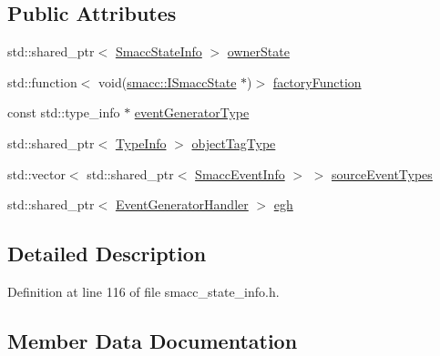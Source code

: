 \subsection*{Public Attributes}
\begin{DoxyCompactItemize}
\item 
std\+::shared\+\_\+ptr$<$ \hyperlink{classsmacc_1_1introspection_1_1SmaccStateInfo}{Smacc\+State\+Info} $>$ \hyperlink{structsmacc_1_1introspection_1_1SmaccEventGeneratorInfo_a94090c0b701e0acd191a62dca72bdf75}{owner\+State}
\item 
std\+::function$<$ void(\hyperlink{classsmacc_1_1ISmaccState}{smacc\+::\+I\+Smacc\+State} $\ast$)$>$ \hyperlink{structsmacc_1_1introspection_1_1SmaccEventGeneratorInfo_a19442e678750a68217b73065111fbe60}{factory\+Function}
\item 
const std\+::type\+\_\+info $\ast$ \hyperlink{structsmacc_1_1introspection_1_1SmaccEventGeneratorInfo_a28c9e5858033ff3fad51b3f046161e93}{event\+Generator\+Type}
\item 
std\+::shared\+\_\+ptr$<$ \hyperlink{classsmacc_1_1introspection_1_1TypeInfo}{Type\+Info} $>$ \hyperlink{structsmacc_1_1introspection_1_1SmaccEventGeneratorInfo_a53c830e2fb8d743c60fd5ca251826dd1}{object\+Tag\+Type}
\item 
std\+::vector$<$ std\+::shared\+\_\+ptr$<$ \hyperlink{structsmacc_1_1introspection_1_1SmaccEventInfo}{Smacc\+Event\+Info} $>$ $>$ \hyperlink{structsmacc_1_1introspection_1_1SmaccEventGeneratorInfo_a345db76d2ceb2ffbe02cd233f39c6724}{source\+Event\+Types}
\item 
std\+::shared\+\_\+ptr$<$ \hyperlink{classsmacc_1_1introspection_1_1EventGeneratorHandler}{Event\+Generator\+Handler} $>$ \hyperlink{structsmacc_1_1introspection_1_1SmaccEventGeneratorInfo_abc60a1025edd1215e85a6af3ef9c9e19}{egh}
\end{DoxyCompactItemize}


\subsection{Detailed Description}


Definition at line 116 of file smacc\+\_\+state\+\_\+info.\+h.



\subsection{Member Data Documentation}
\mbox{\label{structsmacc_1_1introspection_1_1SmaccEventGeneratorInfo_abc60a1025edd1215e85a6af3ef9c9e19}} 
